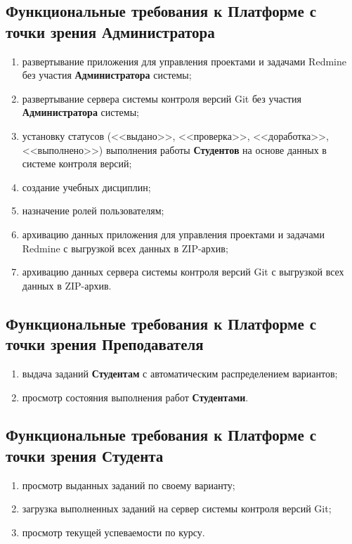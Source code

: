 \subsection*{Функциональные требования к Платформе с точки зрения Администратора}
\begin{enumerate} 
	\item развертывание приложения для управления проектами и задачами Redmine без участия \textbf{Администратора} системы;
	\item развертывание сервера системы контроля версий Git без участия \textbf{Администратора} системы;
	\item установку статусов (<<выдано>>, <<проверка>>, <<доработка>>, <<выполнено>>) выполнения работы \textbf{Студентов} на основе данных в системе контроля версий;
	\item создание учебных дисциплин;
	\item назначение ролей пользователям;
	\item архивацию данных приложения для управления проектами и задачами Redmine с выгрузкой всех данных в ZIP-архив;
	\item архивацию данных сервера системы контроля версий Git с выгрузкой всех данных в ZIP-архив.
\end{enumerate}

\subsection*{Функциональные требования к Платформе с точки зрения Преподавателя}

\begin{enumerate}
			\item выдача заданий \textbf{Студентам} с автоматическим распределением вариантов;
	\item просмотр состояния выполнения работ \textbf{Студентами}.
\end{enumerate}

\subsection*{Функциональные требования к Платформе с точки зрения Студента}

	\begin{enumerate} 
		\item просмотр выданных заданий по своему варианту;
		\item загрузка выполненных заданий на сервер системы контроля версий Git;
		\item просмотр текущей успеваемости по курсу.
	\end{enumerate}

